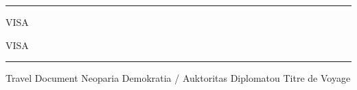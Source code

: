 \documentclass[a4paper,11pt]{article}
\begin{document}
\hrule
\vspace{1mm}

\begin{minipage}{\linewidth}
    \center
    VISA
\end{minipage}

\vfill

\begin{minipage}{\linewidth}
    \center
    VISA
\end{minipage}

\vspace{2mm}
\hrule

\begin{minipage}{\linewidth}
    \center
    \small
    \fontsize{10pt}{10pt}\selectfont
    \scshape


    Travel Document
    \hfill
    Neoparia Demokratia / Auktoritas Diplomatou
    \hfill
    Titre de Voyage
\end{minipage}
\end{document}
